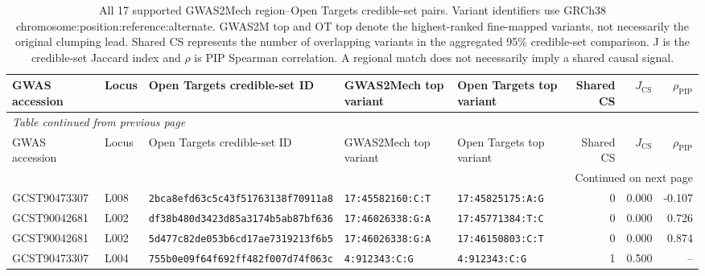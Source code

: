 \documentclass[11pt,a4paper]{article}
\begin{document}
\begin{landscape}
\begingroup
\tiny
\setlength{\tabcolsep}{3pt}
\renewcommand{\arraystretch}{1.12}

\begin{longtable}{@{}llp{4.2cm}p{2.8cm}p{2.8cm}rrr@{}}

\caption{
All 17 supported GWAS2Mech region--Open Targets
credible-set pairs. Variant identifiers use
GRCh38 chromosome:position:reference:alternate.
GWAS2M top and OT top denote the highest-ranked
fine-mapped variants, not necessarily the original
clumping lead. Shared CS represents the number
of overlapping variants in the aggregated
95\% credible-set comparison. J is the
credible-set Jaccard index and $\rho$ is
PIP Spearman correlation. A regional match
does not necessarily imply a shared causal signal.
}
\label{tab:step13_all_loci}\\

\toprule
GWAS accession &
Locus &
Open Targets credible-set ID &
GWAS2Mech top variant &
Open Targets top variant &
Shared CS &
$J_{\mathrm{CS}}$ &
$\rho_{\mathrm{PIP}}$ \\
\midrule
\endfirsthead

\multicolumn{8}{l}{
\textit{Table continued from previous page}}\\
\toprule
GWAS accession &
Locus &
Open Targets credible-set ID &
GWAS2Mech top variant &
Open Targets top variant &
Shared CS &
$J_{\mathrm{CS}}$ &
$\rho_{\mathrm{PIP}}$ \\
\midrule
\endhead

\midrule
\multicolumn{8}{r}{Continued on next page}\\
\endfoot

\bottomrule
\endlastfoot

GCST90473307 & L008 &
\texttt{2bca8efd63c5c43f51763138f70911a8} &
\texttt{17:45582160:C:T} &
\texttt{17:45825175:A:G} &
0 & 0.000 & -0.107 \\

GCST90042681 & L002 &
\texttt{df38b480d3423d85a3174b5ab87bf636} &
\texttt{17:46026338:G:A} &
\texttt{17:45771384:T:C} &
0 & 0.000 & 0.726 \\

GCST90042681 & L002 &
\texttt{5d477c82de053b6cd17ae7319213f6b5} &
\texttt{17:46026338:G:A} &
\texttt{17:46150803:C:T} &
0 & 0.000 & 0.874 \\

GCST90473307 & L004 &
\texttt{755b0e09f64f692ff482f007d74f063c} &
\texttt{4:912343:C:G} &
\texttt{4:912343:C:G} &
1 & 0.500 & -- \\


\end{longtable}
\end{landscape}
\end{document}

